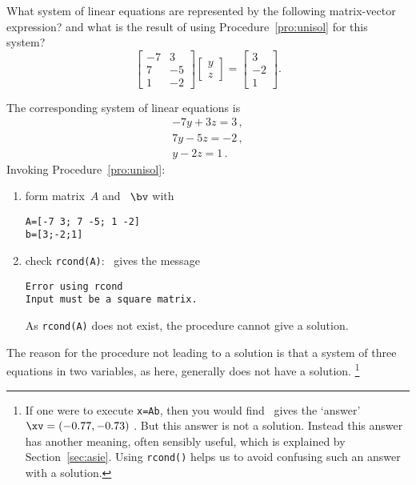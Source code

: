 \begin{example} \label{eg:}
What system of linear equations are represented by the following matrix-vector expression?  and what is the result of using Procedure~\ref{pro:unisol} for this system?
\begin{equation*}
\begin{bmatrix} -7&3\\ 7&-5\\1&-2 \end{bmatrix}
\begin{bmatrix} y\\z \end{bmatrix}
=\begin{bmatrix} 3\\-2\\1 \end{bmatrix}.
\end{equation*}

\begin{solution} 
The corresponding system of linear equations is
\begin{equation*}
\begin{array}{l}
-7y+3z=3\,,\\7y-5z=-2\,,\\y-2z=1\,.
\end{array}
\end{equation*}
Invoking Procedure~\ref{pro:unisol}:
\begin{enumerate}
\item form matrix~\(A\) and ~\(\bv\) with
\begin{verbatim}
A=[-7 3; 7 -5; 1 -2]
b=[3;-2;1]
\end{verbatim}
\setbox\ajrqrbox\hbox{}%
\marginpar{\usebox{\ajrqrbox\\[2ex]}}%

\item check \verb|rcond(A)|: \script\ gives the message
\begin{verbatim}
Error using rcond
Input must be a square matrix. 
\end{verbatim}
As \verb|rcond(A)| does not exist, the procedure cannot give a solution.
\end{enumerate}
The reason for the procedure not leading to a solution is that a system of three equations in two variables, as here, generally does not have a solution.
\footnote{If one were to execute \texttt{x=A\slosh b}, then you would find \script\ gives the `answer' \(\xv=(-0.77,-0.73)\) \twodp.
But this answer is not a solution.
Instead this answer has another meaning, often sensibly useful, which is explained by Section~\ref{sec:asie}.
Using \texttt{rcond()} helps us to avoid confusing such an answer with a solution.}
\end{solution}
\end{example}




